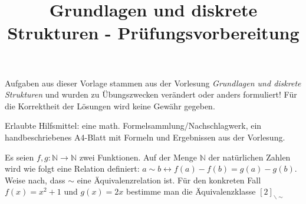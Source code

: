 \documentclass[10pt, a4paper]{exam}
\title{Grundlagen und diskrete Strukturen - Prüfungsvorbereitung}
\author{}
\date{}
\begin{document}
\begin{myboxii}[Disclaimer]
  Aufgaben aus dieser Vorlage stammen aus der Vorlesung \textit{Grundlagen und diskrete Strukturen} und wurden zu Übungszwecken verändert oder anders formuliert! Für die Korrektheit der Lösungen wird keine Gewähr gegeben.
\end{myboxii}

Erlaubte Hilfsmittel: eine math. Formelsammlung/Nachschlagwerk, ein handbeschriebenes A4-Blatt mit Formeln und Ergebnissen aus der Vorlesung.

\begin{questions}
  \question

  \question Es seien $f,g:\mathbb{N}\rightarrow\mathbb{N}$ zwei Funktionen. Auf der Menge $\mathbb{N}$ der natürlichen Zahlen wird wie folgt eine Relation definiert: $a \sim b \leftrightarrow f(a)-f(b)=g(a)-g(b)$. Weise nach, dass $\sim$ eine Äquivalenzrelation ist. Für den konkreten Fall $f(x)=x^2+1$ und $g(x)=2x$ bestimme man die Äquivalenzklasse $[2]_{\backslash\sim}$
  \begin{solution}
  \end{solution}


\end{questions}
\end{document}
